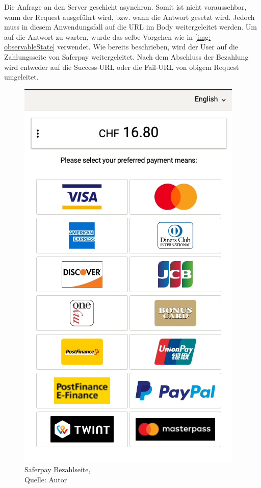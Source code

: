 Die Anfrage an den Server geschieht asynchron. Somit ist nicht voraussehbar, wann der Request ausgeführt wird, bzw. wann die Antwort gesetzt wird. Jedoch muss in diesem Anwendungsfall auf die URL im Body weitergeleitet werden. Um auf die Antwort zu warten, wurde das selbe Vorgehen wie in \ref{img: observableState} verwendet. 
Wie bereits beschrieben, wird der User auf die Zahlungsseite von Saferpay weitergeleitet. Nach dem Abschluss der Bezahlung wird entweder auf die Success-URL oder die Fail-URL  von obigem Request umgeleitet. 
\begin{figure}[H]
	\centering
	\includegraphics[scale=0.5]{images/paymentSaferpay.PNG}
	\caption[Saferpay Bezahlseite]{Saferpay Bezahlseite,\\ Quelle: Autor}
	\label{img: paymentSaferpay}
\end{figure} 

